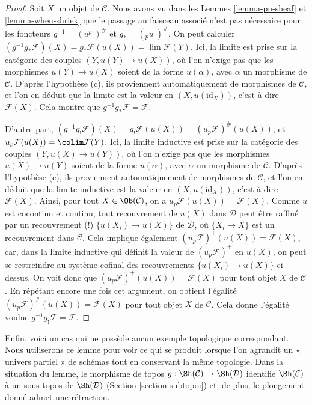 \begin{proof}
Soit $X$ un objet de $\mathcal{C}$.
Nous avons vu dans les Lemmes \ref{lemma-pu-sheaf} et
\ref{lemma-when-shriek} que le passage au faisceau associé n’est pas
nécessaire pour les foncteurs
$g^{-1} = (u^p\ )^\#$ et $g_{*} = ({}_pu\ )^\#$.
On peut calculer
$(g^{-1}g_{*}\mathcal{F})(X) = g_{*}\mathcal{F}(u(X))
= \lim \mathcal{F}(Y)$. Ici, la limite est prise sur la catégorie des couples
$(Y, u(Y) \to u(X))$, où l’on n’exige pas que les morphismes
$u(Y) \to u(X)$ soient de la forme $u(\alpha)$, avec $\alpha$ un morphisme de
$\mathcal{C}$. D’après l’hypothèse (c), ils proviennent automatiquement de
morphismes de $\mathcal{C}$, et l’on en déduit que la limite est la valeur en
$(X, u(\text{id}_X))$, c’est-à-dire $\mathcal{F}(X)$.
Cela montre que $g^{-1}g_{*}\mathcal{F} = \mathcal{F}$.

\medskip\noindent
D’autre part, $(g^{-1}g_{!}\mathcal{F})(X) =
g_{!}\mathcal{F}(u(X)) = (u_p\mathcal{F})^\#(u(X))$, et
$u_p\mathcal{F}(u(X)) = \colim \mathcal{F}(Y)$.
Ici, la limite inductive est prise sur la catégorie des couples
$(Y, u(X) \to u(Y))$, où l’on n’exige pas que les morphismes
$u(X) \to u(Y)$ soient de la forme $u(\alpha)$, avec $\alpha$ un morphisme de
$\mathcal{C}$. D’après l’hypothèse (c), ils proviennent automatiquement de
morphismes de $\mathcal{C}$, et l’on en déduit que la limite inductive est la
valeur en $(X, u(\text{id}_X))$, c’est-à-dire $\mathcal{F}(X)$. Ainsi, pour
tout $X \in \Ob(\mathcal{C})$, on a
$u_p\mathcal{F}(u(X)) = \mathcal{F}(X)$.
Comme $u$ est cocontinu et continu, tout recouvrement de $u(X)$ dans
$\mathcal{D}$ peut être raffiné par un recouvrement (!)
$\{u(X_i) \to u(X)\}$ de $\mathcal{D}$, où $\{X_i \to X\}$ est un
recouvrement dans $\mathcal{C}$. Cela implique également
$(u_p\mathcal{F})^+(u(X)) = \mathcal{F}(X)$, car, dans la limite inductive qui
définit la valeur de $(u_p\mathcal{F})^+$ en $u(X)$, on peut se restreindre au
système cofinal des recouvrements $\{u(X_i) \to u(X)\}$ ci-dessus. On voit
donc que $(u_p\mathcal{F})^+(u(X)) = \mathcal{F}(X)$ pour tout objet $X$ de
$\mathcal{C}$. En répétant encore une fois cet argument, on obtient l’égalité
$(u_p\mathcal{F})^\#(u(X)) = \mathcal{F}(X)$ pour tout objet $X$ de
$\mathcal{C}$. Cela donne l’égalité voulue
$g^{-1}g_!\mathcal{F} = \mathcal{F}$.
\end{proof}

\noindent
Enfin, voici un cas qui ne possède aucun exemple topologique correspondant.
Nous utiliserons ce lemme pour voir ce qui se produit lorsque l’on agrandit
un « univers partiel » de schémas tout en conservant la même topologie. Dans
la situation du lemme, le morphisme de topos
$g : \Sh(\mathcal{C}) \to \Sh(\mathcal{D})$ identifie
$\Sh(\mathcal{C})$ à un sous-topos de $\Sh(\mathcal{D})$
(Section \ref{section-subtopoi}) et, de plus, le plongement donné admet une
rétraction.

